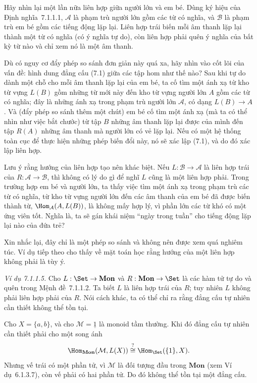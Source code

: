 Hãy nhìn lại một lần nữa liên hợp giữa người lớn và em bé. Dùng ký hiệu của Định nghĩa~7.1.1.1, $\mathcal A$ là phạm trù người lớn gồm các từ có nghĩa, và $\mathcal B$ là phạm trù em bé gồm các tiếng động lặp lại. Liên hợp trái biến mỗi âm thanh lặp lại thành một từ có nghĩa (có ý nghĩa tự do), còn liên hợp phải quên ý nghĩa của bất kỳ từ nào và chỉ xem nó là một âm thanh.

Dù có nguy cơ đẩy phép so sánh đơn giản này quá xa, hãy nhìn vào cốt lõi của vấn đề: hình dung đẳng cấu (7.1) giữa các tập hom như thế nào? Sau khi tự do dành một chỗ cho mỗi âm thanh lặp lại của em bé, ta cố tìm một ánh xạ từ kho từ vựng $L(B)$ gồm những từ mới này đến kho từ vựng người lớn $A$ gồm các từ có nghĩa; đây là những ánh xạ trong
phạm trù người lớn $\mathcal A$, có dạng $L(B)\to A$. Và (đẩy phép so sánh thêm một chút) em bé cố tìm một ánh xạ (mà ta có thể nhìn như việc bắt chước) từ tập $B$ những âm thanh lặp lại được của mình đến tập $R(A)$ những âm thanh mà người lớn có vẻ lặp lại. Nếu có một hệ thống toàn cục để thực hiện những phép biến đổi này, nó sẽ xác lập (7.1), và do đó xác lập liên hợp.

Lưu ý rằng hướng của liên hợp tạo nên khác biệt. Nếu $L:\mathcal B\to\mathcal A$ là liên hợp trái của $R:\mathcal A\to\mathcal B$, thì không có lý do gì để nghĩ $L$ cũng là một liên hợp phải. Trong trường hợp em bé và người lớn, ta thấy việc tìm một ánh xạ trong phạm trù các từ có nghĩa, từ kho từ vựng người lớn đến các âm thanh của em bé đã được biến thành từ, $\Hom_{\mathcal A}(A,L(B))$, là không mấy hợp lý, vì phần lớn các từ khó có một ứng viên tốt. Nghĩa là, ta sẽ gán khái niệm ``ngày trong tuần'' cho tiếng động lặp lại nào của đứa trẻ?

Xin nhắc lại, đây chỉ là một phép so sánh và không nên được xem quá nghiêm túc. Ví dụ tiếp theo cho thấy về mặt toán học rằng hướng của một liên hợp không phải là tùy ý.

\noindent\textit{Ví dụ 7.1.1.5.}\keepwithnext
Cho $L:\Set\to\mathbf{Mon}$ và $R:\mathbf{Mon}\to\Set$ là các hàm tử tự do và quên trong Mệnh đề~7.1.1.2. Ta biết $L$ là liên hợp trái của $R$; tuy nhiên $L$ không phải liên hợp phải của $R$. Nói cách khác, ta có thể chỉ ra rằng đẳng cấu tự nhiên cần thiết không thể tồn tại.

Cho $X=\{a,b\}$, và cho $\mathcal M=\underline1$ là monoid tầm thường. Khi đó đẳng cấu tự nhiên cần thiết phải cho một song ánh
\[
\Hom_{\mathbf{Mon}}(\mathcal M,L(X))\overset{?}{\cong}\Hom_{\Set}(\{1\},X).
\]
Nhưng vế trái có một phần tử, vì $\mathcal M$ là đối tượng đầu trong $\mathbf{Mon}$ (xem Ví dụ~6.1.3.7), còn vế phải có hai phần tử. Do đó không thể tồn tại một đẳng cấu.

